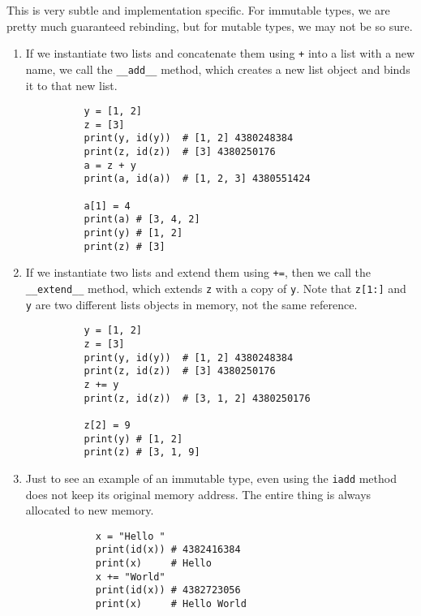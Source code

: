 \documentclass{article}
\begin{document}
    \begin{example}[Warning]
      This is very subtle and implementation specific. For immutable types, we are pretty much guaranteed rebinding, but for mutable types, we may not be so sure.  
      \begin{enumerate}
        \item If we instantiate two lists and concatenate them using \texttt{+} into a list with a new name, we call the \texttt{\_\_add\_\_} method, which creates a new list object and binds it to that new list.  
        \begin{lstlisting}
          y = [1, 2]
          z = [3]
          print(y, id(y))  # [1, 2] 4380248384
          print(z, id(z))  # [3] 4380250176
          a = z + y
          print(a, id(a))  # [1, 2, 3] 4380551424

          a[1] = 4
          print(a) # [3, 4, 2]
          print(y) # [1, 2]
          print(z) # [3]
        \end{lstlisting}

        \item If we instantiate two lists and extend them using \texttt{+=}, then we call the \texttt{\_\_extend\_\_} method, which extends \texttt{z} with a copy of \texttt{y}. Note that \texttt{z[1:]} and \texttt{y} are two different lists objects in memory, not the same reference. 
        \begin{lstlisting}
          y = [1, 2]
          z = [3]
          print(y, id(y))  # [1, 2] 4380248384
          print(z, id(z))  # [3] 4380250176
          z += y
          print(z, id(z))  # [3, 1, 2] 4380250176

          z[2] = 9
          print(y) # [1, 2]
          print(z) # [3, 1, 9]
        \end{lstlisting}

        \item Just to see an example of an immutable type, even using the \texttt{iadd} method does not keep its original memory address. The entire thing is always allocated to new memory. 
          \begin{lstlisting}
            x = "Hello " 
            print(id(x)) # 4382416384
            print(x)     # Hello
            x += "World"
            print(id(x)) # 4382723056
            print(x)     # Hello World
          \end{lstlisting}
      \end{enumerate}
    \end{example}
\end{document}
